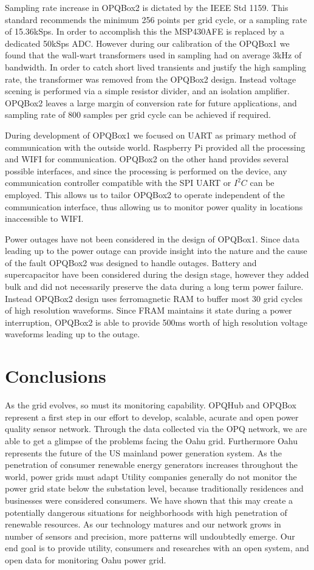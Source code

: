 Sampling rate increase in OPQBox2 is dictated by the IEEE Std 1159.\cite{ieee_pq} This standard recommends the minimum 256 points per grid cycle, or a sampling rate of 15.36kSps. In order to accomplish this
the MSP430AFE is replaced by a dedicated 50kSps ADC. However during our calibration of the OPQBox1 we found that the wall-wart transformers used in sampling had on average 3kHz of bandwidth.
In order to catch short lived transients and justify the high sampling rate, the transformer was removed from the OPQBox2 design. Instead voltage scening is performed via a simple resistor
divider, and an isolation amplifier. OPQBox2 leaves a large margin of conversion rate for future applications, and sampling rate of 800 samples per grid cycle can be achieved if required.

During development of OPQBox1 we focused on UART as primary method of communication with the outside world. Raspberry Pi provided all the processing and WIFI for communication. OPQBox2 on the other hand provides several possible interfaces, and since the processing is performed on the device, any communication controller compatible with the SPI UART or $I^2C$
can be employed. This allows us to tailor OPQBox2 to operate independent of the communication interface, thus allowing us to monitor power quality in locations inaccessible to WIFI.

Power outages have not been considered in the design of OPQBox1. Since data leading up to the power outage can provide insight into the nature and the cause of the fault OPQBox2 was
designed to handle outages. Battery and supercapacitor have been considered during the design stage, however they added bulk and did not necessarily preserve the data during a long term power failure. Instead OPQBox2 design uses ferromagnetic RAM to buffer most 30 grid cycles of high resolution waveforms. Since FRAM maintains it state during a power interruption, 
OPQBox2 is able to provide 500ms worth of high resolution voltage waveforms leading up to the outage.

\section{Conclusions}

As the grid evolves, so must its monitoring capability. OPQHub and OPQBox represent a first step in our effort to develop, scalable, acurate and open power quality sensor network. Through the data collected via the OPQ network, we are able to get a glimpse of the problems facing the Oahu grid. Furthermore Oahu represents the future of the US mainland power generation system. As the penetration of consumer renewable energy generators increases throughout the world, power grids must adapt  Utility companies generally do not monitor the power grid state below the substation level, because traditionally residences and businesses were considered consumers. We have shown that this may create a potentially dangerous situations for neighborhoods with high penetration of renewable resources. As our technology matures and our network grows in number of sensors and precision, more patterns will undoubtedly emerge. Our end goal is to provide utility, consumers and researches with an open system, and open data for monitoring Oahu power grid.
